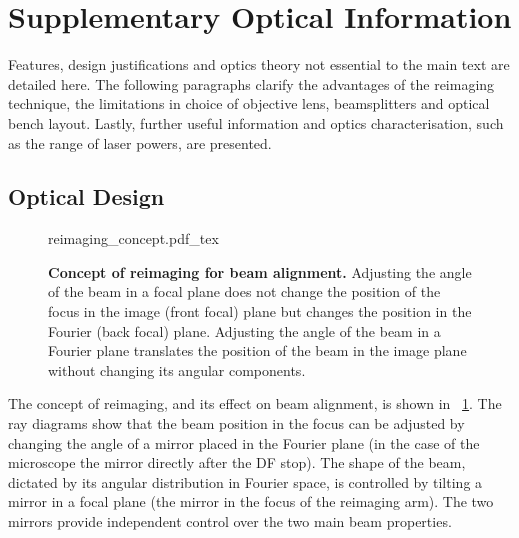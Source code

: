 \documentclass{article}
\begin{document}
\section{Supplementary Optical Information}

Features, design justifications and optics theory not essential to the main text are detailed here. The following paragraphs clarify the advantages of the reimaging technique, the limitations in choice of objective lens, beamsplitters and optical bench layout. Lastly, further useful information and optics characterisation, such as the range of laser powers, are presented.

\subsection{Optical Design}

\begin{figure}[h]
\centering
{reimaging_concept.pdf_tex}
\caption*
{\textbf{Concept of reimaging for beam alignment.} Adjusting the angle of the beam in a focal plane does not change the position of the focus in the image (front focal) plane but changes the position in the Fourier (back focal) plane. Adjusting the angle of the beam in a Fourier plane translates the position of the beam in the image plane without changing its angular components.}
\label{fig:reimaging_concept}
\end{figure}

The concept of reimaging, and its effect on beam alignment, is shown in \figurename~\ref{fig:reimaging_concept}. The ray diagrams show that the beam position in the focus can be adjusted by changing the angle of a mirror placed in the Fourier plane (in the case of the microscope the mirror directly after the DF stop). The shape of the beam, dictated by its angular distribution in Fourier space, is controlled by tilting a mirror in a focal plane (the mirror in the focus of the reimaging arm). The two mirrors provide independent control over the two main beam properties.
\end{document}
